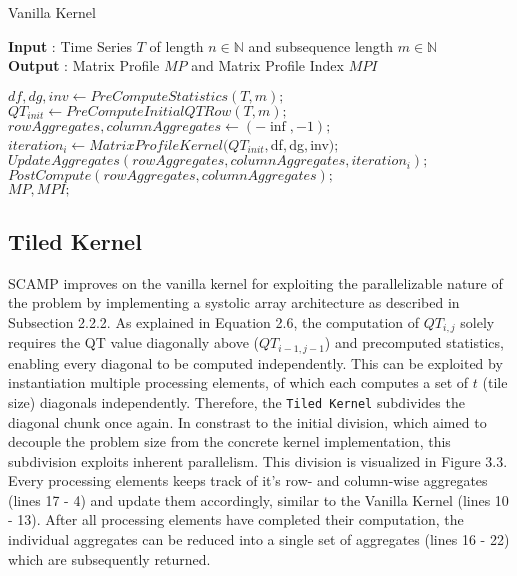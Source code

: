 \begin{algorithm}
\caption{Vanilla Kernel}\label{alg:Vanilla Kernel}
    \hspace*{\algorithmicindent} \textbf{Input} : Time Series $T$ of length \( n \in \mathbb{N} \) and subsequence length  \( m \in \mathbb{N} \) \\
    \hspace*{\algorithmicindent} \textbf{Output} : Matrix Profile $MP$ and Matrix Profile Index $MPI$
    \begin{algorithmic}[1]
        \State $df,dg,inv \gets PreComputeStatistics(T, m);$
        \State $QT_{init} \gets PreComputeInitialQTRow(T, m);$
        \State $rowAggregates, columnAggregates \gets (-\inf, -1);$
            \State $iteration_i \gets MatrixProfileKernel(QT_{init}, $df$, $dg$, $inv$);$
            \State $UpdateAggregates(rowAggregates, columnAggregates, iteration_i);$
        \EndFor
        \State $PostCompute(rowAggregates, columnAggregates);$\\
        \Return $MP, MPI;$
    \end{algorithmic}
\end{algorithm}
    
\subsection{Tiled Kernel}

SCAMP improves on the vanilla kernel for exploiting the parallelizable nature of the problem by implementing a systolic array architecture as described in Subsection 2.2.2.
As explained in Equation 2.6, the computation of $QT_{i,j}$ solely requires the QT value diagonally above ($QT_{i-1, j-1}$) and precomputed statistics, enabling every diagonal to be computed independently.
This can be exploited by instantiation multiple processing elements, of which each computes a set of $t$ (tile size) diagonals independently.
Therefore, the \texttt{Tiled Kernel} subdivides the diagonal chunk once again.
In constrast to the initial division, which aimed to decouple the problem size from the concrete kernel implementation, this subdivision exploits inherent parallelism. This division is visualized in Figure 3.3.\\

Every processing elements keeps track of it's row- and column-wise aggregates (lines 17 - 4) and update them accordingly,
similar to the Vanilla Kernel (lines 10 - 13). After all processing elements have completed their computation,
the individual aggregates can be reduced into a single set of aggregates (lines 16 - 22) which are subsequently returned.\\

